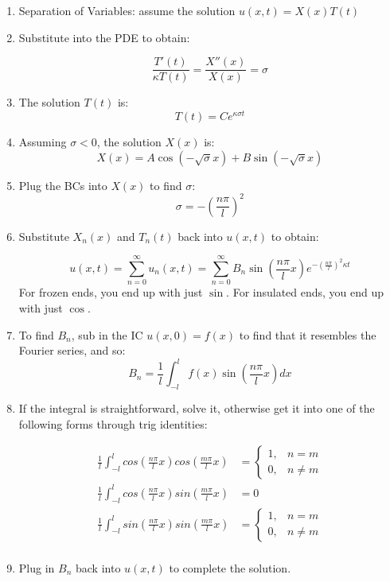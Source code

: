 \documentclass[11pt]{article}
\begin{document}
\begin{enumerate}

\item Separation of Variables: assume the solution $u(x,t) = X(x)T(t)$
\item Substitute into the PDE to obtain:

$$ \frac{T'(t)}{\kappa T(t)} = \frac{X''(x)}{X(x)} = \sigma $$

\item The solution $T(t)$ is:
$$ T(t) = Ce^{\kappa \sigma t}$$

\item Assuming $\sigma < 0$, the solution $X(x)$ is:
$$ X(x) = A\cos(-\sqrt{\sigma}x) + B\sin(-\sqrt{\sigma}x) $$

\item Plug the BCs into $X(x)$ to find $\sigma$:
$$ \sigma = -(\frac{n\pi}{l})^2 $$
\item Substitute $X_n(x)$ and $T_n(t)$ back into $u(x,t)$ to obtain:

$$ u(x,t) = \sum \limits_{n=0}^{\infty} u_n(x,t) = \sum \limits_{n=0}^{\infty} B_n \sin(\frac{n\pi}{l}x)e^{-(\frac{n\pi}{l})^2\kappa t}$$
For frozen ends, you end up with just $\sin$. For insulated ends, you end up with just $\cos$.

\item To find $B_n$, sub in the IC $u(x,0)=f(x)$ to find that it resembles the Fourier series, and so:
$$ B_n = \frac{1}{l} \int_{-l}^{l} f(x) \sin(\frac{n\pi}{l}x) dx$$

\item If the integral is straightforward, solve it, otherwise get it into one of the following forms through trig identities:

\begin{align*}
	\frac{1}{l} \int_{-l}^{l} cos(\frac{n\pi}{l}x)cos(\frac{m\pi}{l}x) &=
		\begin{cases}
			1, & n=m \\
			0, & n\neq m
		\end{cases}\\
\frac{1}{l} \int_{-l}^{l} cos(\frac{n\pi}{l}x)sin(\frac{m\pi}{l}x) &= 0 \\
\frac{1}{l} \int_{-l}^{l} sin(\frac{n\pi}{l}x)sin(\frac{m\pi}{l}x) &=
		\begin{cases}
			1, & n=m \\
			0, & n\neq m
		\end{cases}\\
\end{align*}

\item Plug in $B_n$ back into $u(x,t)$ to complete the solution.

\end{enumerate}
\end{document}
